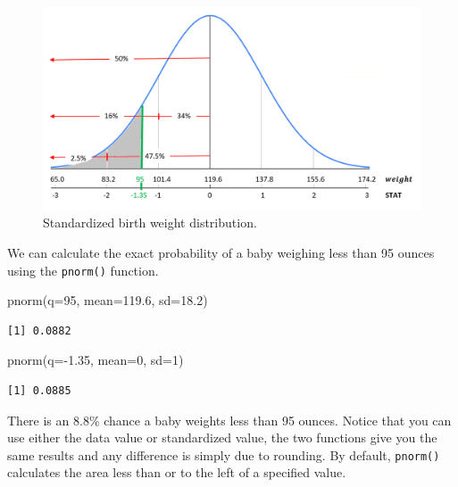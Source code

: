 \documentclass[
  letterpaper,
  DIV=11,
  numbers=noendperiod]{scrreprt}
\newenvironment{Shaded}{\begin{snugshade}}{\end{snugshade}}
\newcommand{\AttributeTok}[1]{\textcolor[rgb]{0.40,0.45,0.13}{#1}}
\newcommand{\DecValTok}[1]{\textcolor[rgb]{0.68,0.00,0.00}{#1}}
\newcommand{\FloatTok}[1]{\textcolor[rgb]{0.68,0.00,0.00}{#1}}
\newcommand{\FunctionTok}[1]{\textcolor[rgb]{0.28,0.35,0.67}{#1}}
\newcommand{\NormalTok}[1]{\textcolor[rgb]{0.00,0.23,0.31}{#1}}
\newcommand{\SpecialCharTok}[1]{\textcolor[rgb]{0.37,0.37,0.37}{#1}}
\theoremstyle{definition}
\theoremstyle{remark}
\begin{document}
\begin{figure}

{\centering \includegraphics{images/standardization3.png}

}

\caption{\label{fig-standardization3}Standardized birth weight
distribution.}

\end{figure}

We can calculate the exact probability of a baby weighing less than 95
ounces using the \texttt{pnorm()} function.

\begin{Shaded}
\begin{Highlighting}[]
\FunctionTok{pnorm}\NormalTok{(}\AttributeTok{q=}\DecValTok{95}\NormalTok{, }\AttributeTok{mean=}\FloatTok{119.6}\NormalTok{, }\AttributeTok{sd=}\FloatTok{18.2}\NormalTok{)}
\end{Highlighting}
\end{Shaded}

\begin{verbatim}
[1] 0.0882
\end{verbatim}

\begin{Shaded}
\begin{Highlighting}[]
\FunctionTok{pnorm}\NormalTok{(}\AttributeTok{q=}\SpecialCharTok{{-}}\FloatTok{1.35}\NormalTok{, }\AttributeTok{mean=}\DecValTok{0}\NormalTok{, }\AttributeTok{sd=}\DecValTok{1}\NormalTok{)}
\end{Highlighting}
\end{Shaded}

\begin{verbatim}
[1] 0.0885
\end{verbatim}

There is an 8.8\% chance a baby weights less than 95 ounces. Notice that
you can use either the data value or standardized value, the two
functions give you the same results and any difference is simply due to
rounding. By default, \texttt{pnorm()} calculates the area less than or
to the left of a specified value.
\end{document}
